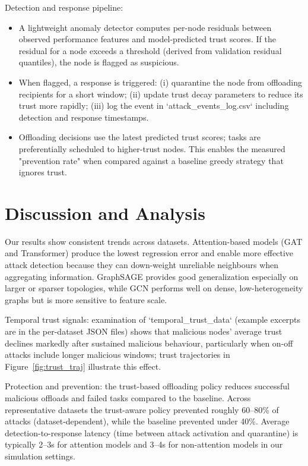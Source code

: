 \documentclass[12pt,a4paper]{article}
\begin{document}
Detection and response pipeline:
\begin{itemize}
  \item A lightweight anomaly detector computes per-node residuals between observed performance features and model-predicted trust scores. If the residual for a node exceeds a threshold (derived from validation residual quantiles), the node is flagged as suspicious.
  \item When flagged, a response is triggered: (i) quarantine the node from offloading recipients for a short window; (ii) update trust decay parameters to reduce its trust more rapidly; (iii) log the event in `attack_events_log.csv` including detection and response timestamps.
  \item Offloading decisions use the latest predicted trust scores; tasks are preferentially scheduled to higher-trust nodes. This enables the measured "prevention rate" when compared against a baseline greedy strategy that ignores trust.
\end{itemize}

\section{Discussion and Analysis}
Our results show consistent trends across datasets. Attention-based models (GAT and Transformer) produce the lowest regression error and enable more effective attack detection because they can down-weight unreliable neighbours when aggregating information. GraphSAGE provides good generalization especially on larger or sparser topologies, while GCN performs well on dense, low-heterogeneity graphs but is more sensitive to feature scale.

Temporal trust signals: examination of `temporal_trust_data` (example excerpts are in the per-dataset JSON files) shows that malicious nodes' average trust declines markedly after sustained malicious behaviour, particularly when on-off attacks include longer malicious windows; trust trajectories in Figure~\ref{fig:trust_traj} illustrate this effect.

Protection and prevention: the trust-based offloading policy reduces successful malicious offloads and failed tasks compared to the baseline. Across representative datasets the trust-aware policy prevented roughly 60--80\% of attacks (dataset-dependent), while the baseline prevented under 40\%. Average detection-to-response latency (time between attack activation and quarantine) is typically 2--3s for attention models and 3--4s for non-attention models in our simulation settings.
\end{document}
